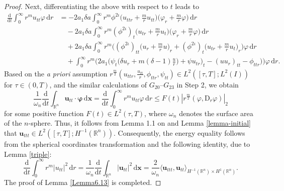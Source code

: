 \documentclass[11pt,reqno]{amsart}
\numberwithin{rk}{section}
\numberwithin{prop}{section}
\numberwithin{mydef}{section}
\numberwithin{lem}{section}
\numberwithin{equation}{section}
\numberwithin{thm}{section}
\begin{document}
\begin{proof}
Next, differentiating the above with respect to $t$ leads to
\begin{equation*} 
\begin{aligned}
\frac{\mathrm{d}}{\mathrm{d}t}\int_0^\infty r^mu_{tt}\varphi\,\mathrm{d}r&=-2a_1\delta a\int_0^\infty r^m\phi^{2\iota}\big(u_{ttr}+\frac{m}{r}u_{tt}\big)\big(\varphi_r+\frac{m}{r}\varphi\big)\,\mathrm{d}r\\
&\quad -2a_1\delta a\int_0^\infty r^m(\phi^{2\iota})_t\big(u_{tr}+\frac{m}{r}u_t\big)\big(\varphi_r+\frac{m}{r}\varphi\big)\,\mathrm{d}r\\
&\quad +2a_1\delta a\int_0^\infty r^m\Big((\phi^{2\iota})_{tt}\big(u_{r}+\frac{m}{r}u\big)_r+(\phi^{2\iota})_t\big(u_{tr}+\frac{m}{r}u_t\big)_r\Big)\varphi\,\mathrm{d}r\\
&\quad + \int_0^\infty r^m \Big(2a_1\Big(\psi_t \big(\delta u_r+m(\delta-1)\frac{u}{r}\big) +\psi  u_{tr}\Big)_t-(uu_r)_{tt}-\phi_{ttr}\big)\Big) \varphi\,\mathrm{d}r.
\end{aligned}    
\end{equation*}
Based on the {\it a priori} assumption $r^\frac{m}{2}(u_{ttr},\frac{u_{tt}}{r},\phi_{ttr},\psi_{tt})\in L^2([\tau,T];L^2(I))$ for $\tau\in (0,T)$, 
and the similar calculations of $G_{20}$--$G_{23}$ in Step 2, we obtain 
\begin{equation*}
\frac{1}{\omega_n}\frac{\mathrm{d}}{\mathrm{d}t}\int_{\mathbb{R}^n} \boldsymbol{u}_{tt}\cdot\boldsymbol{\varphi}\,\mathrm{d}\boldsymbol{x}=\frac{\mathrm{d}}{\mathrm{d}t}\int_0^\infty r^mu_{tt}\varphi\,\mathrm{d}r\leq F(t)|r^\frac{m}{2}(\varphi,\mathrm{D}_r\varphi)|_2
\end{equation*}
for some positive function $F(t)\in L^2(\tau,T)$, where $\omega_n$ denotes the surface area of the $n$-sphere. Thus, it follows from Lemma 1.1 on \cite[page 250]{temam} and  Lemma \ref{lemma-initial}  that $\boldsymbol{u}_{ttt}\in L^2([\tau,T];H^{-1}(\mathbb{R}^n))$. Consequently, the energy equality follows  from the spherical coordinates transformation and the following identity, due to Lemma \ref{triple}:
\begin{equation*}
\frac{\mathrm{d}}{\mathrm{d}t}\int_0^\infty r^m|u_{tt}|^2\,\mathrm{d}r=\frac{1}{\omega_n}\frac{\mathrm{d}}{\mathrm{d}t}\int_{\mathbb{R}^n} |\boldsymbol{u}_{tt}|^2\,\mathrm{d}\boldsymbol{x}=\frac{2}{\omega_n}\langle \boldsymbol{u}_{ttt},\boldsymbol{u}_{tt}\rangle_{H^{-1}(\mathbb{R}^n)\times H^1(\mathbb{R}^n)}.
\end{equation*}
The proof of Lemma \ref{Lemma6.13} is completed.
\end{proof}
\end{document}
